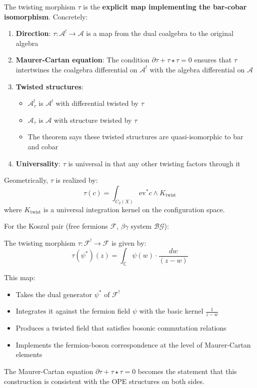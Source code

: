 \begin{remark}\label{rem:twisting-morphism-meaning}
The twisting morphism $\tau$ is the \textbf{explicit map implementing the bar-cobar isomorphism}. Concretely:

\begin{enumerate}
\item \textbf{Direction}: $\tau: \mathcal{A}^! \to \mathcal{A}$ is a map from the dual coalgebra to the original algebra

\item \textbf{Maurer-Cartan equation}: The condition $\partial \tau + \tau \star \tau = 0$ ensures that $\tau$ intertwines the coalgebra differential on $\mathcal{A}^!$ with the algebra differential on $\mathcal{A}$

\item \textbf{Twisted structures}: 
   \begin{itemize}
   \item $\mathcal{A}^!_{\tau}$ is $\mathcal{A}^!$ with differential twisted by $\tau$
   \item $\mathcal{A}_{\tau}$ is $\mathcal{A}$ with structure twisted by $\tau$
   \item The theorem says these twisted structures are quasi-isomorphic to bar and cobar
   \end{itemize}

\item \textbf{Universality}: $\tau$ is universal in that any other twisting factors through it
\end{enumerate}

Geometrically, $\tau$ is realized by:
$$\tau(c) = \int_{C_2(X)} \text{ev}^* c \wedge K_{\text{twist}}$$
where $K_{\text{twist}}$ is a universal integration kernel on the configuration space.
\end{remark}

\begin{example}
For the Koszul pair (free fermions $\mathcal{F}$, $\beta\gamma$ system $\mathcal{BG}$):

The twisting morphism $\tau: \mathcal{F}^! \to \mathcal{F}$ is given by:
$$\tau(\psi^*)(z) = \int_{\mathbb{C}} \psi(w) \cdot \frac{dw}{(z-w)}$$

This map:
\begin{itemize}
\item Takes the dual generator $\psi^*$ of $\mathcal{F}^!$
\item Integrates it against the fermion field $\psi$ with the basic kernel $\frac{1}{z-w}$
\item Produces a twisted field that satisfies bosonic commutation relations
\item Implements the fermion-boson correspondence at the level of Maurer-Cartan elements
\end{itemize}

The Maurer-Cartan equation $\partial \tau + \tau \star \tau = 0$ becomes the statement that this construction is consistent with the OPE structures on both sides.
\end{example}


